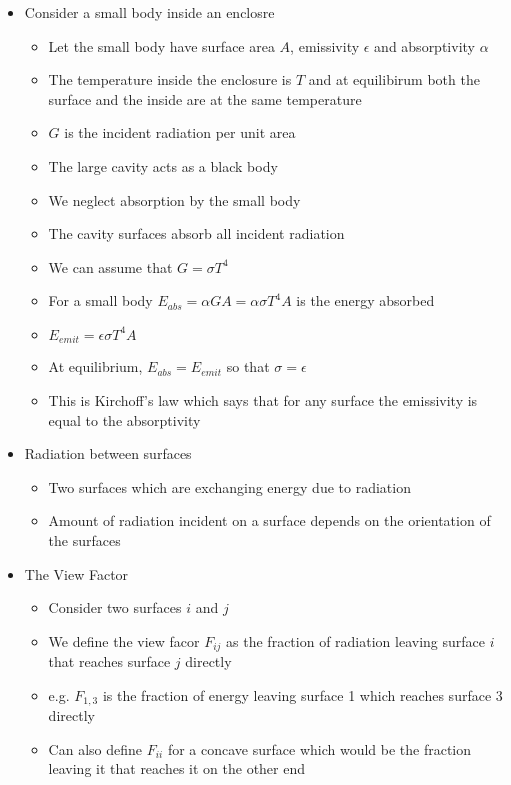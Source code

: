 \documentclass[12pt]{article}
\begin{document}
\begin{itemize}
    \item Consider a small body inside an enclosre \begin{itemize}
        \item Let the small body have surface area $A$, emissivity $\epsilon$ and absorptivity $\alpha$
        \item The temperature inside the enclosure is $T$ and at equilibirum both the surface and the inside are at the same temperature 
        \item $G$ is the incident radiation per unit area 
        \item The large cavity acts as a black body
        \item We neglect absorption by the small body
        \item The cavity surfaces absorb all incident radiation 
        \item We can assume that $G = \sigma T^4$ 
        \item For a small body $E_{abs} = \alpha G A  =\alpha \sigma T^4 A$ is the energy absorbed
        \item $E_{emit} = \epsilon \sigma T^4 A$
        \item At equilibrium, $E_{abs} = E_{emit}$ so that $\sigma = \epsilon$
        \item This is Kirchoff's law which says that for any surface the emissivity is equal to the absorptivity 
    \end{itemize}
    \item Radiation between surfaces \begin{itemize}
        \item Two surfaces which are exchanging energy due to radiation 
        \item Amount of radiation incident on a surface depends on the orientation of the surfaces 
    \end{itemize}
    \item The View Factor \begin{itemize}
        \item Consider two surfaces $i$ and $j$
        \item We define the view facor $F_{ij}$ as the fraction of radiation leaving surface $i$ that reaches surface $j$ directly
        \item e.g. $F_{1,3}$ is the fraction of energy leaving surface 1 which reaches surface 3 directly
        \item Can also define $F_{ii}$ for a concave surface which would be the fraction leaving it that reaches it on the other end 

\end{itemize}
\end{itemize}
\end{document}
